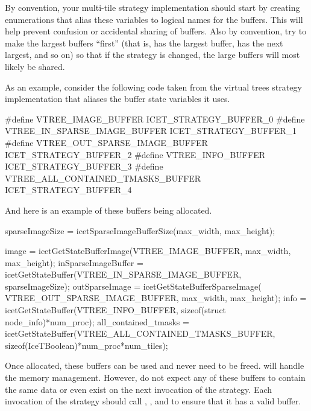 By convention, your multi-tile strategy implementation should start by
creating  enumerations that alias these variables to
logical names for the buffers.  This will help prevent confusion or
accidental sharing of buffers.  Also by convention, try to make the largest
buffers ``first'' (that is,  has the
largest buffer,  has the next largest, and
so on) so that if the strategy is changed, the large buffers will most
likely be shared.

As an example, consider the following code taken from the virtual trees
strategy implementation that aliases the buffer state variables it uses.

\begin{code}
#define VTREE_IMAGE_BUFFER              ICET_STRATEGY_BUFFER_0
#define VTREE_IN_SPARSE_IMAGE_BUFFER    ICET_STRATEGY_BUFFER_1
#define VTREE_OUT_SPARSE_IMAGE_BUFFER   ICET_STRATEGY_BUFFER_2
#define VTREE_INFO_BUFFER               ICET_STRATEGY_BUFFER_3
#define VTREE_ALL_CONTAINED_TMASKS_BUFFER ICET_STRATEGY_BUFFER_4
\end{code}

And here is an example of these buffers being allocated.

\begin{code}
sparseImageSize = icetSparseImageBufferSize(max_width, max_height);

image                = icetGetStateBufferImage(VTREE_IMAGE_BUFFER,
                                               max_width, max_height);
inSparseImageBuffer  = icetGetStateBuffer(VTREE_IN_SPARSE_IMAGE_BUFFER,
                                          sparseImageSize);
outSparseImage       = icetGetStateBufferSparseImage(
                                              VTREE_OUT_SPARSE_IMAGE_BUFFER,
                                              max_width, max_height);
info                 = icetGetStateBuffer(VTREE_INFO_BUFFER,
                                         sizeof(struct node_info)*num_proc);
all_contained_tmasks = icetGetStateBuffer(VTREE_ALL_CONTAINED_TMASKS_BUFFER,
                                    sizeof(IceTBoolean)*num_proc*num_tiles);
\end{code}

Once allocated, these buffers can be used and never need to be freed.
\IceT will handle the memory management.  However, do not expect any of
these buffers to contain the same data or even exist on the next invocation
of the strategy.  Each invocation of the strategy should call
, , and
 to ensure that it has a valid buffer.

